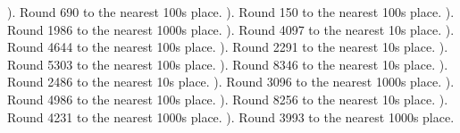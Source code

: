 \documentclass{article}%
\begin{document}
). Round 690 to the nearest 100s place.%
\newline%
\newline%
). Round 150 to the nearest 100s place.%
\newline%
\newline%
). Round 1986 to the nearest 1000s place.%
\newline%
\newline%
). Round 4097 to the nearest 10s place.%
\newline%
\newline%
). Round 4644 to the nearest 100s place.%
\newline%
\newline%
). Round 2291 to the nearest 10s place.%
\newline%
\newline%
). Round 5303 to the nearest 100s place.%
\newline%
\newline%
). Round 8346 to the nearest 10s place.%
\newline%
\newline%
). Round 2486 to the nearest 10s place.%
\newline%
\newline%
). Round 3096 to the nearest 1000s place.%
\newline%
\newline%
). Round 4986 to the nearest 100s place.%
\newline%
\newline%
). Round 8256 to the nearest 10s place.%
\newline%
\newline%
). Round 4231 to the nearest 1000s place.%
\newline%
\newline%
). Round 3993 to the nearest 1000s place.%
\end{document}
